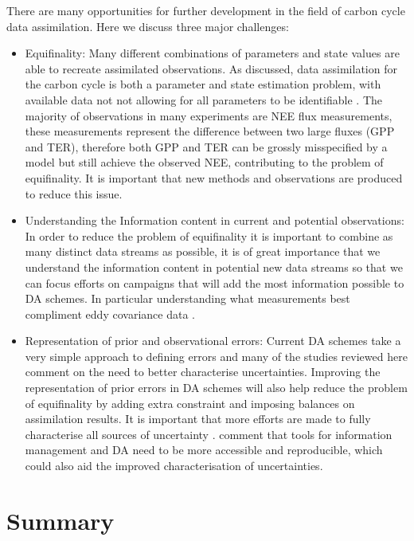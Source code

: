 There are many opportunities for further development in the field of carbon cycle data assimilation. Here we discuss three major challenges:

\begin{itemize}

\item Equifinality: Many different combinations of parameters and state values are able to recreate assimilated observations. As discussed, data assimilation for the carbon cycle is both a parameter and state estimation problem, with available data not not allowing for all parameters to be identifiable \citep{Luo2009}. The majority of observations in many experiments are NEE flux measurements, these measurements represent the difference between two large fluxes (GPP and TER), therefore both GPP and TER can be grossly misspecified by a model but still achieve the observed NEE, contributing to the problem of equifinality. It is important that new methods and observations are produced to reduce this issue.

\item Understanding the Information content in current and potential observations: In order to reduce the problem of equifinality it is important to combine as many distinct data streams as possible, it is of great importance that we understand the information content in potential new data streams so that we can focus efforts on campaigns that will add the most information possible to DA schemes. In particular understanding what measurements best compliment eddy covariance data \citep{rayner2010current, williams2009improving}.

\item Representation of prior and observational errors: Current DA schemes take a very simple approach to defining errors and many of the studies reviewed here comment on the need to better characterise uncertainties. Improving the representation of prior errors in DA schemes will also help reduce the problem of equifinality by adding extra constraint and imposing balances on assimilation results. It is important that more efforts are made to fully characterise all sources of uncertainty \citep{Keenan2011, raupach2005model}. \citet{Dietze2013} comment that tools for information management and DA need to be more accessible and reproducible, which could also aid the improved characterisation of uncertainties.
\end{itemize}

\section{Summary} 

